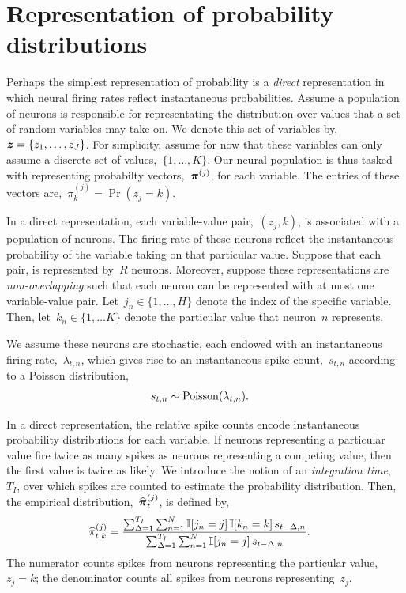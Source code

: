 \section{Representation of probability distributions}

\sloppy
Perhaps the simplest representation of probability is a \emph{direct}
representation in which neural firing rates reflect instantaneous
probabilities. Assume a population of neurons is responsible for
representating the distribution over values that a set of random
variables may take on. We denote this set of variables 
by,~${\boldsymbol{z} = \{z_1, \ldots, z_J\}}$.  For
simplicity, assume for now that these variables can only assume a
discrete set of values,~${\{1, \ldots, K\}}$.   Our
neural population is thus tasked with representing probabilty
vectors,~$\boldsymbol{\pi}^{(j)}$, for each 
variable. The entries of these vectors are,~${\pi^{(j)}_k = \Pr(z_j=k)}$.

In a direct representation, each variable-value pair,~$(z_j,k)$, is associated with a population of neurons. The firing
rate of these neurons reflect the instantaneous probability of the
variable taking on that particular value.  Suppose that each
pair, is represented by~$R$ neurons. Moreover, suppose
these representations are \emph{non-overlapping} such that each neuron
can be represented with at most one variable-value pair.
Let~${j_n \in \{1, \ldots, H\}}$
denote the index of the specific variable.
Then, let~$k_n \in \{1, \ldots K\}$ denote the particular value that neuron~$n$ represents.

We assume these neurons are stochastic, each endowed
with an instantaneous firing rate,~$\lambda_{t,n}$, which gives rise to an
instantaneous spike count,~$s_{t,n}$ according to a Poisson distribution,
\begin{align}
s_{t,n} &\sim \mathrm{Poisson}(\lambda_{t,n}).
\end{align}

In a direct representation, the relative spike counts encode
instantaneous probability distributions for each variable. 
If neurons representing a particular value fire twice as many 
spikes as neurons representing a competing value, then the first 
value is twice as likely. We introduce the notion of an 
\emph{integration time},~$T_I$, over which spikes are counted 
to estimate the probability distribution. Then, the empirical 
distribution,~$\widehat{\boldsymbol{\pi}}_t^{(j)}$, is defined by,
\begin{align}
  \widehat{\pi}_{t,k}^{(j)} &=
  \frac{\sum_{\Delta = 1}^{T_I} \sum_{n=1}^N \mathbb{I}[j_n=j] \, \mathbb{I}[k_n=k] \, s_{t-\Delta,n}}
       {\sum_{\Delta = 1}^{T_I} \sum_{n=1}^N \mathbb{I}[j_n=j] \, s_{t-\Delta,n}}.
\end{align}
The numerator counts spikes from neurons representing the particular value,~$z_j=k$;
the denominator counts all spikes from neurons representing~$z_j$.

